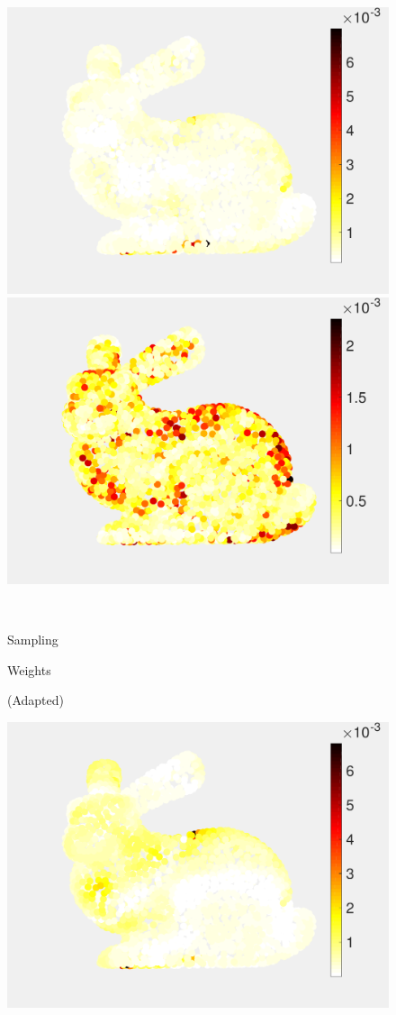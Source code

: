\documentclass[journal, 10pt]{IEEEtran}
\begin{document}
\begin{figure}[H]
\begin{minipage}[m]{0.4\linewidth}
\centerline{\includegraphics[width=.85\linewidth]{fig_rec_low_weights}}
\end{minipage}
\begin{minipage}[m]{0.4\linewidth}
\centerline{\includegraphics[width=.85\linewidth]{fig_rec_band_weights}}
\end{minipage} \\
\begin{minipage}[m]{0.16\linewidth}
\centerline{\small{Sampling}}
\centerline{\small{Weights}}
\centerline{\small{(Adapted)}}
\end{minipage}
\begin{minipage}[m]{0.4\linewidth}
\centerline{\includegraphics[width=.85\linewidth]{fig_rec_low_weights_adapted}}

\end{minipage}
\end{figure}
\end{document}

